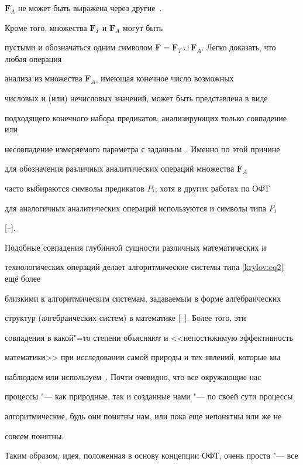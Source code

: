 $\mathbf{F}_{A}$ не может быть выражена через другие~\cite{krylov:bib3,krylov:bib6}. 

Кроме того, множества $\mathbf{F}_{T}$ и $\mathbf{F}_{A}$ могут быть

пустыми и обозначаться одним символом $\mathbf{F} =

\mathbf{F}_{T}\cup \mathbf{F}_{A}$. Легко доказать, что любая операция

анализа из множества $\mathbf{F}_{A}$, имеющая конечное число возможных

числовых и (или) нечисловых значений, может быть представлена в виде

подходящего конечного набора предикатов, анализирующих только совпадение или

несовпадение измеряемого параметра с заданным~\cite{krylov:bib7}. Именно по этой причине

для обозначения различных аналитических операций множества $\mathbf{F}_{A}$

часто выбираются символы предикатов $P_{i}$, хотя в других работах по ОФТ

для аналогичных аналитических операций используются и символы типа $F_{i}$

[--].



Подобные совпадения глубинной сущности различных математических и

технологических операций делает алгоритмические системы типа \eqref{krylov:eq2} ещё более

близкими к алгоритмическим системам, задаваемым в форме алгебраических

структур (алгебраических систем) в математике [--]. Более того, эти

совпадения в какой"=то степени объясняют и <<непостижимую эффективность

математики>> при исследовании самой природы и тех явлений, которые мы

наблюдаем или используем~\cite{krylov:bib9}. Почти очевидно, что все окружающие нас

процессы "--- как природные, так и созданные нами "--- по своей сути процессы

алгоритмические, будь они понятны нам, или пока еще непонятны или же не

совсем понятны.



Таким образом, идея, положенная в основу концепции ОФТ, очень проста "--- все

